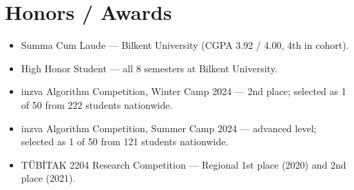 \documentclass[letterpaper,11pt]{article}
\newcommand{\resumeItemTitleless}[1]{
  \item\small{
    {#1 \vspace{-2pt}}
  }
}
\newcommand{\resumeSubHeadingListStart}{\begin{itemize}[leftmargin=*]}
\newcommand{\resumeSubHeadingListEnd}{\end{itemize}}
\begin{document}
\section{Honors / Awards}
\resumeSubHeadingListStart
\resumeItemTitleless{Summa Cum Laude --- Bilkent University (CGPA 3.92 / 4.00, 4th in cohort).}
\resumeItemTitleless{High Honor Student --- all 8 semesters at Bilkent University.}
\resumeItemTitleless{inzva Algorithm Competition, Winter Camp 2024 --- 2nd place; selected as 1 of 50 from 222 students nationwide.}
\resumeItemTitleless{inzva Algorithm Competition, Summer Camp 2024 --- advanced level; selected as 1 of 50 from 121 students nationwide.}
\resumeItemTitleless{TÜBİTAK 2204 Research Competition --- Regional 1st place (2020) and 2nd place (2021).}
\resumeSubHeadingListEnd
\end{document}

